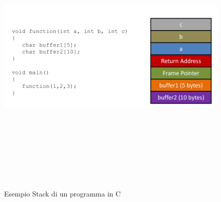 \begin{figure}[htbp]
	\centering%
	\subfigure%
	{\includegraphics[height=13cm, width=13cm, keepaspectratio]{Immagini/sistemi_operativi/esempio_stack.png}}
	\caption{Esempio Stack di un programma in C\label{fig:esempio_stack}} 	
\end{figure}
